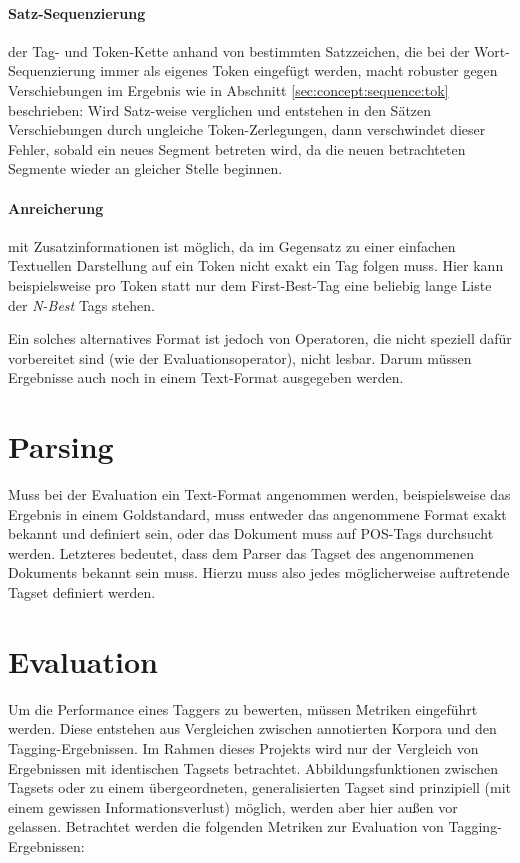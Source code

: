 \paragraph{Satz-Sequenzierung} der Tag- und Token-Kette anhand von bestimmten Satzzeichen, die bei der Wort-Sequenzierung immer als eigenes Token eingefügt werden, macht robuster gegen Verschiebungen im Ergebnis wie in Abschnitt \ref{sec:concept:sequence:tok} beschrieben: Wird Satz-weise verglichen und entstehen in den Sätzen Verschiebungen durch ungleiche Token-Zerlegungen, dann verschwindet dieser Fehler, sobald ein neues Segment betreten wird, da die neuen betrachteten Segmente wieder an gleicher Stelle beginnen.
\paragraph{Anreicherung} mit Zusatzinformationen ist möglich, da im Gegensatz zu einer einfachen Textuellen Darstellung auf ein Token nicht exakt ein Tag folgen muss. Hier kann beispielsweise pro Token statt nur dem First-Best-Tag eine beliebig lange Liste der \textit{N-Best} Tags stehen.

Ein solches alternatives Format ist jedoch von Operatoren, die nicht speziell dafür vorbereitet sind (wie der Evaluationsoperator), nicht lesbar. Darum müssen Ergebnisse auch noch in einem Text-Format ausgegeben werden.

\section{Parsing}
Muss bei der Evaluation ein Text-Format angenommen werden, beispielsweise das Ergebnis in einem Goldstandard, muss entweder das angenommene Format exakt bekannt und definiert sein, oder das Dokument muss auf POS-Tags durchsucht werden. Letzteres bedeutet, dass dem Parser das Tagset des angenommenen Dokuments bekannt sein muss. Hierzu muss also jedes möglicherweise auftretende Tagset definiert werden.

\section{Evaluation}
Um die Performance eines Taggers zu bewerten, müssen Metriken eingeführt werden. Diese entstehen aus Vergleichen zwischen annotierten Korpora und den Tagging-Ergebnissen. Im Rahmen dieses Projekts wird nur der Vergleich von Ergebnissen mit identischen Tagsets betrachtet. Abbildungsfunktionen zwischen Tagsets oder zu einem übergeordneten, generalisierten Tagset sind prinzipiell (mit einem gewissen Informationsverlust) möglich, werden aber hier außen vor gelassen. Betrachtet werden die folgenden Metriken zur Evaluation von Tagging-Ergebnissen:



